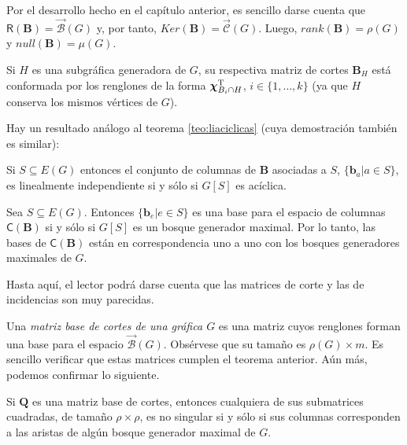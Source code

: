  Por el desarrollo hecho en el capítulo anterior, es sencillo darse cuenta que $\mathsf{R}(\mathbf{B}) =\overrightarrow{\mathcal{B}}(G)$ y, por tanto, $Ker(\mathbf{B}) = \overrightarrow{\mathcal{C}}(G)$. Luego, $rank(\mathbf{B}) = \rho(G)$ y $null(\mathbf{B}) = \mu(G)$.
 
Si $H$ es una subgráfica generadora de $G$, su respectiva matriz de cortes $\mathbf{B}_{H}$ está conformada por los renglones de la forma $\boldsymbol{\chi}_{B_{i} \cap H}^{\textnormal{T}}$, $i\in\{1, \ldots, k\}$ (ya que $H$ conserva los mismos vértices de $G$). 

Hay un resultado análogo al teorema \ref{teo:liaciclicas} (cuya demostración también es similar):
\begin{teo}\label{teo:limatrizcortes}
Si $S\subseteq E(G)$ entonces el conjunto de columnas de $\mathbf{B}$ asociadas a $S$, $\{\mathbf{b}_{a}| a \in S\}$, es linealmente independiente si y sólo si $G[S]$ es acíclica.
\end{teo}

\begin{cor} Sea
$S \subseteq E(G)$. Entonces $\{\mathbf{b}_{e} | e \in S\}$ es una base para el espacio de columnas $\mathsf{C}(\mathbf{B})$ si y sólo si $G[S]$ es un bosque generador maximal. Por lo tanto, las bases de $\mathsf{C}(\mathbf{B})$ están en correspondencia uno a uno con los bosques generadores maximales de $G$.
\end{cor} 


Hasta aquí, el lector podrá darse cuenta que las matrices de corte y las de incidencias son muy parecidas.

 Una \textit{matriz base de cortes de una gráfica $G$} es una matriz cuyos renglones forman una base para el espacio $\overrightarrow{\mathcal{B}}(G)$. Obsérvese que su tamaño es $\rho(G) \times m$. Es sencillo verificar que estas matrices cumplen el teorema anterior. Aún más, podemos confirmar lo siguiente.

\begin{teo} \label{teo:submatricesmatridecortes}
Si $\mathbf{Q}$ es una matriz base de cortes, entonces cualquiera de sus submatrices cuadradas, de tamaño $\rho \times \rho$, es no singular si y sólo si sus columnas corresponden a las aristas de algún bosque generador maximal de $G$.
\end{teo}

